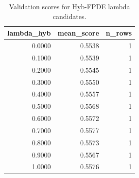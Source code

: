 \begin{table}[t]
\caption{Validation scores for Hyb-FPDE lambda candidates.}
\label{tab:lambda_distribution_computed}
\centering
\begin{tabular}{rrr}
\toprule
lambda\_hyb & mean\_score & n\_rows \\
\midrule
0.0000 & 0.5538 & 1 \\
0.1000 & 0.5539 & 1 \\
0.2000 & 0.5545 & 1 \\
0.3000 & 0.5550 & 1 \\
0.4000 & 0.5557 & 1 \\
0.5000 & 0.5568 & 1 \\
0.6000 & 0.5572 & 1 \\
0.7000 & 0.5577 & 1 \\
0.8000 & 0.5573 & 1 \\
0.9000 & 0.5567 & 1 \\
1.0000 & 0.5576 & 1 \\
\bottomrule
\end{tabular}

\end{table}
